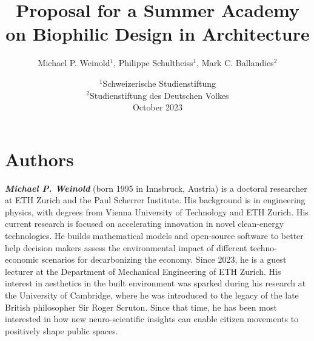 \documentclass{article}
\title{Proposal for a Summer Academy \protect\\ on Biophilic Design in Architecture}
\author{Michael P. Weinold$^1$, Philippe Schultheiss$^1$, Mark C. Ballandies$^2$}
\date{
    $^1$Schweizerische Studienstiftung \\
    $^2$Studienstiftung des Deutschen Volkes \\[3mm]
    October 2023
}
\begin{document}
\maketitle

\section*{\centering Authors}
\vspace{-10mm}



\textbf{\textit{Michael P. Weinold}} (born 1995 in Innsbruck, Austria) is a doctoral researcher at ETH Zurich and the Paul Scherrer Institute. His background is in engineering physics, with degrees from Vienna University of Technology and ETH Zurich. His current research is focused on accelerating innovation in novel clean-energy technologies. He builds mathematical models and open-source software to better help decision makers assess the environmental impact of different techno-economic scenarios for decarbonizing the economy. Since 2023, he is a guest lecturer at the Department of Mechanical Engineering of ETH Zurich. His interest in aesthetics in the built environment was sparked during his research at the University of Cambridge, where he was introduced to the legacy of the late British philosopher Sir Roger Scruton. Since that time, he has been most interested in how new neuro-scientific insights can enable citizen movements to positively shape public spaces.
\end{document}

